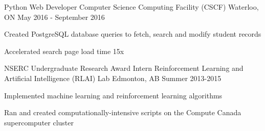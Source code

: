 \begin{cventries}

\cventry
{Python Web Developer} %
{Computer Science Computing Facility (CSCF)} %
{Waterloo, ON} %
{May 2016 - September 2016} %
{ %
\begin{cvitems}
\item {Created PostgreSQL database queries to fetch, search and modify student records}
\item {Accelerated search page load time 15x}
\end{cvitems}
}



\cventry
{NSERC Undergraduate Research Award Intern} %
{Reinforcement Learning and Artificial Intelligence (RLAI) Lab} %
{Edmonton, AB} %
{Summer 2013-2015} %
{ %
\begin{cvitems}
\item {Implemented machine learning and reinforcement learning algorithms}
\item {Ran and created computationally-intensive scripts on the Compute Canada supercomputer cluster}
\end{cvitems}
}

\end{cventries}